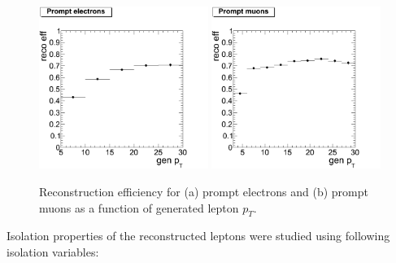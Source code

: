 \documentclass{cmspaper}
\begin{document}
\begin{figure}[htbp]
   \includegraphics[width = 0.49\textwidth]{pictures/genPt_recoEff_prompt/genPt_recoEff_elec_prompt.png}
   \includegraphics[width = 0.49\textwidth]{pictures/genPt_recoEff_prompt/genPt_recoEff_muon_prompt.png}
   \caption{\small{Reconstruction efficiency for (a) prompt electrons and (b) prompt muons as a function of
      generated lepton $p_T$.}
   \label{fig:genPt_recoEff_prompt}}
\end{figure}

Isolation properties of the reconstructed leptons were studied using
 following isolation variables:
\end{document}
